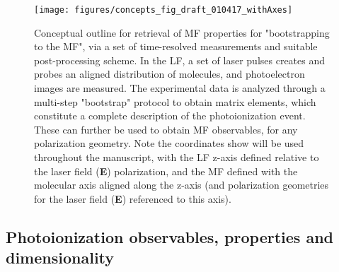 \documentclass[10pt]{article}
\begin{document}

\begin{figure}[]
\begin{center}
\texttt{[image: figures/concepts\_fig\_draft\_010417\_withAxes]}
\caption{Conceptual outline for retrieval of MF properties for "bootstrapping to the MF", via a set of time-resolved measurements and suitable post-processing scheme. In the LF, a set of laser pulses creates and probes an aligned distribution of molecules, and photoelectron images are measured. The experimental data is analyzed through a multi-step "bootstrap" protocol to obtain matrix elements, which constitute a complete description of the photoionization event. These can further be used to obtain MF observables, for any polarization geometry. Note the coordinates show will be used throughout the manuscript, with the LF z-axis defined relative to the laser field (\textbf{E}) polarization, and the MF defined with the molecular axis aligned along the z-axis (and polarization geometries for the laser field (\textbf{E}) referenced to this axis).\label{781808}}
\end{center}
\end{figure}



\subsection{Photoionization observables, properties and dimensionality\label{sec:Photo-into}}
\end{document}

